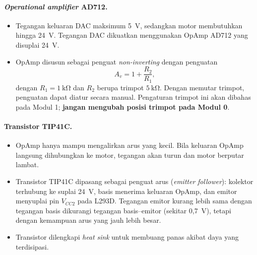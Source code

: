 \documentclass[11pt,a4paper]{article}
\begin{document}
\paragraph{\textit{Operational amplifier} AD712.}
\begin{itemize}
	\item Tegangan keluaran DAC maksimum 5~V, sedangkan motor membutuhkan hingga 24~V. Tegangan DAC dikuatkan menggunakan OpAmp AD712 yang disuplai 24~V.
	\item OpAmp disusun sebagai penguat \textit{non-inverting} dengan penguatan
	      \begin{equation}
		      A_v = 1 + \frac{R_2}{R_1},
		      \label{eq:penguatan_opamp}
	      \end{equation}
	      dengan $R_1 = 1~\mathrm{k\Omega}$ dan $R_2$ berupa trimpot $5~\mathrm{k\Omega}$. Dengan memutar trimpot, penguatan dapat diatur secara manual. Pengaturan trimpot ini akan dibahas pada Modul 1; \textbf{jangan mengubah posisi trimpot pada Modul 0}.
\end{itemize}

\paragraph{Transistor TIP41C.}
\begin{itemize}
	\item OpAmp hanya mampu mengalirkan arus yang kecil. Bila keluaran OpAmp langsung dihubungkan ke motor, tegangan akan turun dan motor berputar lambat.
	\item Transistor TIP41C dipasang sebagai penguat arus (\textit{emitter follower}): kolektor terhubung ke suplai 24~V, basis menerima keluaran OpAmp, dan emitor menyuplai pin $V_{CC2}$ pada L293D. Tegangan emitor kurang lebih sama dengan tegangan basis dikurangi tegangan basis--emitor (sekitar 0,7~V), tetapi dengan kemampuan arus yang jauh lebih besar.
	\item Transistor dilengkapi \textit{heat sink} untuk membuang panas akibat daya yang terdisipasi.
\end{itemize}
\end{document}
